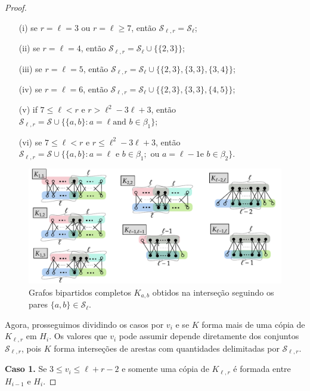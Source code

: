 \documentclass[12pt,a4paper]{book}
\newcommand{\K}{K_{\ell,r}} %
\newcommand{\Slr}{\mathcal{S}_{\ell,r}} %
\begin{document}
\begin{proof}
      \begin{itemize}
      \item [(i)] se $r=\ell = 3$ ou $r=\ell \geq 7$, então
    $\mathcal{S}_{\ell,r} = \mathcal{S}_\ell$;
      \item [(ii)] se $r=\ell = 4$, então $\mathcal{S}_{\ell,r} =
    \mathcal{S}_\ell \cup\big\{\{2,3\}\big\}$;
      \item [(iii)] se $r=\ell = 5$, então $\mathcal{S}_{\ell,r} =
    \mathcal{S}_\ell \cup\big\{\{2,3\},\{3,3\},\{3,4\}\big\}$;
      \item [(iv)] se $r=\ell = 6$, então $\mathcal{S}_{\ell,r} =
    \mathcal{S}_\ell \cup\big\{\{2,3\},\{3,3\},\{4,5\}\big\}$;
      \item[(v)] if $7 \leq \ell < r \text{ e } r > \ell^2-3\ell+3$,
    então $\mathcal{S}_{\ell,r} = \mathcal{S} \cup \{\{a,b\}: a=\ell\text{
    and }b\in \beta_1\}$;
       \item[(vi)] se $7 \leq \ell < r \text{ e } r \leq
    \ell^2-3\ell+3$, então $\mathcal{S}_{\ell,r} = \mathcal{S} \cup
    \{\{a,b\}: a=\ell\text{ e }b\in \beta_1;\text{ ou }a=\ell-1\text{
    e }b\in \beta_2\}$.
      \end{itemize}

     \begin{figure}[htb] \centering 
      \includegraphics[]{Kll-inter.pdf}
       \caption{Grafos bipartidos completos $K_{a,b}$ obtidos na interseção seguindo os pares $\{a,b\} \in\mathcal{S}_\ell$.}
       \label{fig:configKLL}
     \end{figure}

    Agora, prosseguimos dividindo os casos por $v_i$ e se $K$ forma mais de uma cópia de $\K$ em $H_i$. 
    Os valores que $v_i$ pode assumir depende diretamente dos conjuntos $\Slr$, pois $K$ forma interseções de arestas com quantidades delimitadas por $\Slr$.
    
    \medskip \textbf{Caso 1.}
	Se $3 \leq v_i \leq \ell+r-2$ e somente uma cópia de $\K$ é formada entre $H_{i-1}$ e $H_i$.
   

\end{proof}
\end{document}
